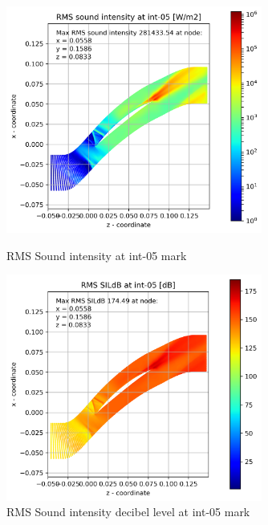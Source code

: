 \begin{figure}[ht]
  \centering
  \includegraphics[width=0.75\textwidth]{Figures/int-05-rms-sil.png}
  \caption{RMS Sound intensity at int-05 mark} \label{int-05-rms-sil}
  
  \vspace*{\floatsep}%

  \includegraphics[width=0.75\textwidth]{Figures/int-05-rms-sildb.png}
  \caption{RMS Sound intensity decibel level at int-05 mark} \label{int-05-rms-sildb}
\end{figure}


